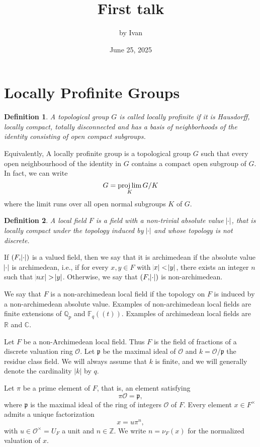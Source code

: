 \documentclass[11pt]{amsart}
\title{First talk}
\author{by Ivan}
\date{June 25, 2025}
\newtheorem{defn}{Definition}
\newcommand{\R}{\mathbb{R}}
\newcommand{\Q}{\mathbb{Q}}
\newcommand{\F}{\mathbb{F}}
\newcommand{\C}{\mathbb{C}}
\begin{document}
\maketitle
\tableofcontents

\section{Locally Profinite Groups}

\begin{defn}
A topological group $G$ is called \textit{locally profinite} if it is Hausdorff, locally compact, totally disconnected and has a basis of neighborhoods of the identity consisting of open compact subgroups.
\end{defn}

Equivalently, A locally profinite group is a topological group $G$ such that
every open neighbourhood of the identity in $G$ contains a compact open subgroup of $G$. In fact, we can write
\[
G = \projlim_{K} G/K
\]
where the limit runs over all open normal subgroups $K$ of $G$.


\begin{defn}
    A local field $F$ is a field with a non-trivial absolute value $\abs{\cdot}$, that is locally compact under the topology induced by $\abs{\cdot}$ and whose topology is not discrete.   
\end{defn}


If $(F,\abs{\cdot})$ is a valued field, then we say that it is archimedean if the absolute value $\abs{\cdot}$ is archimedean, i.e., if for every $x,y \in F$ with $\abs{x} < \abs{y}$, there exists an integer $n$ such that $\abs{nx} > \abs{y}$. Otherwise, we say that $(F,\abs{\cdot})$ is non-archimedean.

We say that $F$ is a non-archimedean local field if the topology on $F$ is induced by a non-archimedean absolute value. Examples of non-archimedean local fields are finite extensions of $\Q_p$ and $\F_q((t))$. Examples of archimedean local fields are $\R$ and $\C$. 

Let $F$ be a non-Archimedean local field. Thus $F$ is the field of fractions of a discrete valuation ring $\mathcal{O}$. Let $\mathfrak{p}$ be the maximal ideal of $\mathcal{O}$ and $k= \mathcal{O}/\mathfrak{p}$ the residue class field. We will always assume that $k$ is finite, and we will generally denote the cardinality $|k|$ by $q$.


Let $\pi$ be a prime element of $F$, that is, an element satisfying
\[
\pi \mathcal{O} = \mathfrak{p},
\]
where $\mathfrak{p}$ is the maximal ideal of the ring of integers $\mathcal{O}$ of $F$.
Every element $x \in F^\times$ admits a unique factorization
\[
x = u \pi^n,
\]
with $u \in \mathcal{O}^\times = U_F$ a unit and $n \in \mathbb{Z}$.
We write $n = \nu_F(x)$ for the normalized valuation of $x$.
\end{document}
